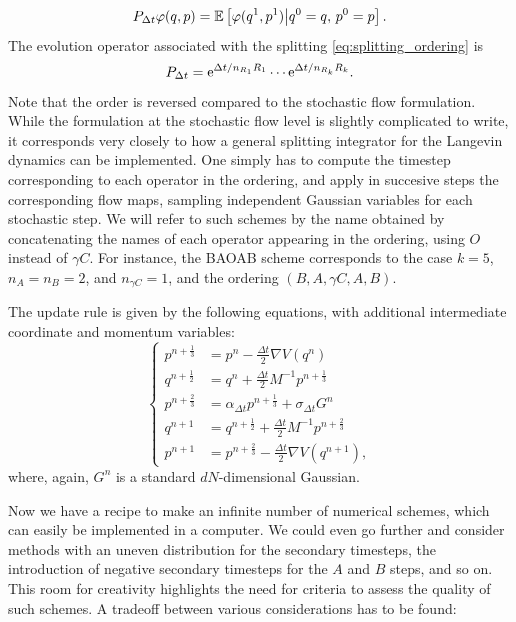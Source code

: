 \begin{equation}
    \label{eq:markov_evolution_operator}
    P_{\Delta t}\varphi (q,p) = \mathbb{E}\left[\varphi(q^1,p^1)\middle|q^0=q,\,p^0=p\right].
\end{equation}
The evolution operator associated with the splitting \eqref{eq:splitting_ordering} is
\begin{equation}
    \label{eq:splitting_semigroup_expr}
    P_{\Delta t}=\mathrm{e}^{{\Delta t}/n_{R_1}R_1}\dotsm\mathrm{e}^{{\Delta t}/n_{R_k}R_k}.
\end{equation}
Note that the order is reversed compared to the stochastic flow formulation.
While the formulation at the stochastic flow level is slightly complicated to write, it corresponds very closely to how a general splitting integrator for the Langevin dynamics can be implemented.
One simply has to compute the timestep corresponding to each operator in the ordering, and apply in succesive steps the corresponding flow maps, sampling independent Gaussian variables for each stochastic step.
We will refer to such schemes by the name obtained by concatenating the names of each operator appearing in the ordering, using $O$ instead of $\gamma C$.
For instance, the BAOAB scheme corresponds to the case $k=5$, $n_A=n_B=2$, and $n_{\gamma C}=1$, and the ordering $(B,A,\gamma C,A,B)$.
    \begin{example}
        The update rule is given by the following equations, with additional intermediate coordinate and momentum variables:
        \begin{equation}\label{baoab}
            \left\{\begin{aligned}
                 p^{n+\frac13} &=p^n -\frac{\Delta t}{2}\nabla V(q^n)\\
                 q^{n+\frac12} &=q^n + \frac{\Delta t}{2} M^{-1}p^{n+\frac 13}\\
                 p^{n+\frac23} &=\alpha_{\Delta t}p^{n+\frac13}+\sigma_{\Delta t}G^n\\
                 q^{n+1} &=q^{n+\frac12} + \frac{\Delta t}{2} M^{-1}p^{n+\frac 23}\\
                 p^{n+1} &= p^{n+\frac23}-\frac{\Delta t}{2}\nabla V(q^{n+1}),
            \end{aligned}\right.
        \end{equation}
        where, again, $G^n$ is a standard $dN$-dimensional Gaussian.
    \end{example}
     Now we have a recipe to make an infinite number of numerical schemes, which can easily be implemented in a computer.
     We could even go further and consider methods with an uneven distribution for the secondary timesteps, the introduction of negative secondary timesteps for the $A$ and $B$ steps, and so on.
     This room for creativity highlights the need for criteria to assess the quality of such schemes. A tradeoff between various considerations has to be found:

